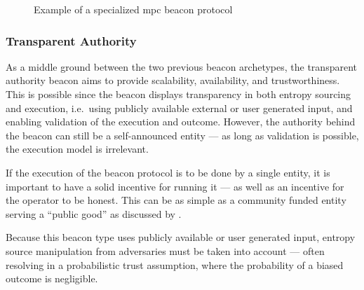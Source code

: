 \begin{figure}[htb]
    \centering
    \footnotesize
    \caption{Example of a specialized \gls{mpc} beacon protocol}\label{fig:mpc_beacon}
\end{figure}


\subsubsection{Transparent Authority}\label{ssub:transparent_authority}
As a middle ground between the two previous beacon archetypes, the transparent authority beacon aims to provide scalability, availability, and trustworthiness.
This is possible since the beacon displays transparency in both entropy sourcing and execution, i.e.\ using publicly available external or user generated input, and enabling validation of the execution and outcome.
However, the authority behind the beacon can still be a self-announced entity --- as long as validation is possible, the execution model is irrelevant.

If the execution of the beacon protocol is to be done by a single entity, it is important to have a solid incentive for running it --- as well as an incentive for the operator to be honest.
This can be as simple as a community funded entity serving a \enquote{public good} as discussed by \citet{bunz2017proofsof}.

Because this beacon type uses publicly available or user generated input, entropy source manipulation from adversaries must be taken into account --- often resolving in a probabilistic trust assumption, where the probability of a biased outcome is negligible.

